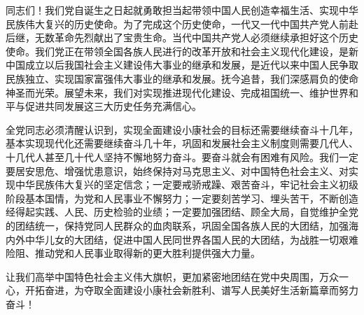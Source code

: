 同志们！我们党自诞生之日起就勇敢担当起带领中国人民创造幸福生活、实现中华民族伟大复兴的历史使命。为了完成这个历史使命，一代又一代中国共产党人前赴后继，无数革命先烈献出了宝贵生命。当代中国共产党人必须继续承担好这个历史使命。我们党正在带领全国各族人民进行的改革开放和社会主义现代化建设，是新中国成立以后我国社会主义建设伟大事业的继承和发展，是近代以来中国人民争取民族独立、实现国家富强伟大事业的继承和发展。抚今追昔，我们深感肩负的使命神圣而光荣。展望未来，我们对实现推进现代化建设、完成祖国统一、维护世界和平与促进共同发展这三大历史任务充满信心。

全党同志必须清醒认识到，实现全面建设小康社会的目标还需要继续奋斗十几年，基本实现现代化还需要继续奋斗几十年，巩固和发展社会主义制度则需要几代人、十几代人甚至几十代人坚持不懈地努力奋斗。要奋斗就会有困难有风险。我们一定要居安思危、增强忧患意识，始终保持对马克思主义、对中国特色社会主义、对实现中华民族伟大复兴的坚定信念；一定要戒骄戒躁、艰苦奋斗，牢记社会主义初级阶段基本国情，为党和人民事业不懈努力；一定要刻苦学习、埋头苦干，不断创造经得起实践、人民、历史检验的业绩；一定要加强团结、顾全大局，自觉维护全党的团结统一，保持党同人民群众的血肉联系，巩固全国各族人民的大团结，加强海内外中华儿女的大团结，促进中国人民同世界各国人民的大团结，为战胜一切艰难险阻、推动党和人民事业取得新的更大胜利提供强大力量。

让我们高举中国特色社会主义伟大旗帜，更加紧密地团结在党中央周围，万众一心，开拓奋进，为夺取全面建设小康社会新胜利、谱写人民美好生活新篇章而努力奋斗！

\bye
